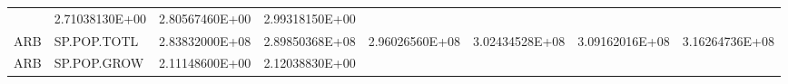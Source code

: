 \documentclass[]{article}
\begin{document}
\begin{longtable}[]{@{}llrrrrrr@{}}
\begin{minipage}[t]{0.11\columnwidth}
\end{minipage} & \begin{minipage}[t]{0.11\columnwidth}\raggedleft\strut
2.71038130E+00\strut
\end{minipage} & \begin{minipage}[t]{0.11\columnwidth}\raggedleft\strut
2.80567460E+00\strut
\end{minipage} & \begin{minipage}[t]{0.11\columnwidth}\raggedleft\strut
2.99318150E+00\strut
\end{minipage}\tabularnewline
\begin{minipage}[t]{0.06\columnwidth}\raggedright\strut
ARB\strut
\end{minipage} & \begin{minipage}[t]{0.08\columnwidth}\raggedright\strut
SP.POP.TOTL\strut
\end{minipage} & \begin{minipage}[t]{0.11\columnwidth}\raggedleft\strut
2.83832000E+08\strut
\end{minipage} & \begin{minipage}[t]{0.11\columnwidth}\raggedleft\strut
2.89850368E+08\strut
\end{minipage} & \begin{minipage}[t]{0.11\columnwidth}\raggedleft\strut
2.96026560E+08\strut
\end{minipage} & \begin{minipage}[t]{0.11\columnwidth}\raggedleft\strut
3.02434528E+08\strut
\end{minipage} & \begin{minipage}[t]{0.11\columnwidth}\raggedleft\strut
3.09162016E+08\strut
\end{minipage} & \begin{minipage}[t]{0.11\columnwidth}\raggedleft\strut
3.16264736E+08\strut
\end{minipage}\tabularnewline
\begin{minipage}[t]{0.06\columnwidth}\raggedright\strut
ARB\strut
\end{minipage} & \begin{minipage}[t]{0.08\columnwidth}\raggedright\strut
SP.POP.GROW\strut
\end{minipage} & \begin{minipage}[t]{0.11\columnwidth}\raggedleft\strut
2.11148600E+00\strut
\end{minipage} & \begin{minipage}[t]{0.11\columnwidth}\raggedleft\strut
2.12038830E+00\strut
\end{minipage} & \begin{minipage}[t]{0.11\columnwidth}\raggedleft\strut

\end{minipage}
\end{longtable}
\end{document}

